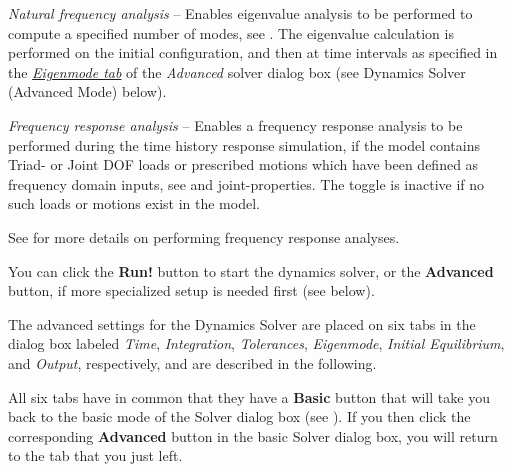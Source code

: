 {\begin{bulletlist}
  \setcounter{enumi}{3}

\item{\sl Natural frequency analysis} -- Enables eigenvalue analysis
  to be performed to compute a specified number of modes, see
  .
  The eigenvalue calculation is performed on the initial configuration,
  and then at time intervals as specified in the
  \protect\hyperlink{eigenmode-tab}{\sl Eigenmode tab} of the {\sl Advanced}
  solver dialog box (see 
  {Dynamics Solver (Advanced Mode)} below).

\item{\sl Frequency response analysis} --
  Enables a frequency response analysis to be performed during the time history
  response simulation, if the model contains Triad- or Joint DOF loads or
  prescribed motions which have been defined as frequency domain inputs, see
   and
                {joint-properties}.
  The toggle is inactive if no such loads or motions exist in the model.

  See 
  for more details on performing frequency response analyses.
\end{bulletlist}

You can click the \textbf{Run!} button to start the dynamics solver, or the
\textbf{Advanced} button, if more specialized setup is needed first (see below).



The advanced settings for the Dynamics Solver are placed on six tabs in the
dialog box labeled {\sl Time}, {\sl Integration}, {\sl Tolerances},
{\sl Eigenmode}, {\sl Initial Equilibrium}, and {\sl Output}, respectively,
and are described in the following.

All six tabs have in common that they have a \textbf{Basic} button that will
take you back to the basic mode of the Solver dialog box
(see ).
If you then click the corresponding \textbf{Advanced} button in the basic
Solver dialog box, you will return to the tab that you just left.


}
